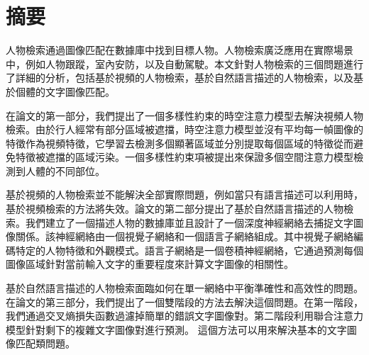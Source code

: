 \chapter*{摘要}
人物檢索通過圖像匹配在數據庫中找到目標人物。人物檢索廣泛應用在實際場景中，例如人物跟蹤，室內安防，以及自動駕駛。本文針對人物檢索的三個問題進行了詳細的分析，包括基於視頻的人物檢索，基於自然語言描述的人物檢索，以及基於個體的文字圖像匹配。

在論文的第一部分，我們提出了一個多樣性約束的時空注意力模型去解決視頻人物檢索。由於行人經常有部分區域被遮擋，時空注意力模型並沒有平均每一幀圖像的特徵作為視頻特徵，它學習去檢測多個顯著區域並分別提取每個區域的特徵從而避免特徵被遮擋的區域污染。一個多樣性約束項被提出來保證多個空間注意力模型檢測到人體的不同部位。

基於視頻的人物檢索並不能解決全部實際問題，例如當只有語言描述可以利用時，基於視頻檢索的方法將失效。論文的第二部分提出了基於自然語言描述的人物檢索。我們建立了一個描述人物的數據庫並且設計了一個深度神經網絡去捕捉文字圖像關係。該神經網絡由一個視覺子網絡和一個語言子網絡組成。其中視覺子網絡編碼特定的人物特徵和外觀模式。語言子網絡是一個卷積神經網絡，它通過預測每個圖像區域針對當前輸入文字的重要程度來計算文字圖像的相關性。

基於自然語言描述的人物檢索面臨如何在單一網絡中平衡準確性和高效性的問題。在論文的第三部分，我們提出了一個雙階段的方法去解決這個問題。在第一階段，我們通過交叉熵損失函數過濾掉簡單的錯誤文字圖像對。第二階段利用聯合注意力模型針對剩下的複雜文字圖像對進行預測。
這個方法可以用來解決基本的文字圖像匹配類問題。
